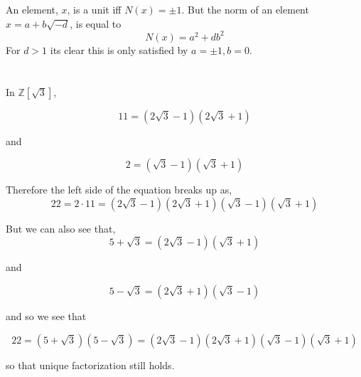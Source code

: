 \documentclass{article}
\begin{document}
\section{}

\section{}
An element, \(x\), is a unit iff \(N(x) = \pm 1\). But the norm of an element \(x = a + b\sqrt{-d}\), is equal to
\begin{equation}
N(x) = a^{2} + db^{2}
\end{equation}
For \(d>1\) its clear this is only satisfied by \(a=\pm 1, b =0\).

\section{}
In \(\mathbb{Z}\left[\sqrt{3}\right]\),

\begin{equation}
11 = (2\sqrt{3} - 1)(2\sqrt{3} + 1)
\end{equation}

and

\begin{equation}
2 = (\sqrt{3} - 1)(\sqrt{3} + 1)
\end{equation}

Therefore the left side of the equation breaks up as,
\begin{equation}
22 = 2 \cdot 11 = (2\sqrt{3} - 1)(2\sqrt{3} + 1)(\sqrt{3} - 1)(\sqrt{3} + 1)
\end{equation}

But we can also see that,
\begin{equation}
5 + \sqrt{3} = (2\sqrt{3} - 1)(\sqrt{3} + 1)
\end{equation}

and

\begin{equation}
5 - \sqrt{3} = (2\sqrt{3} + 1)(\sqrt{3} - 1)
\end{equation}

and so we see that

\begin{equation}
22 = (5 + \sqrt{3})(5 - \sqrt{3}) = (2\sqrt{3} - 1)(2\sqrt{3} + 1)(\sqrt{3} - 1)(\sqrt{3} + 1)
\end{equation}

so that unique factorization still holds.
\end{document}
